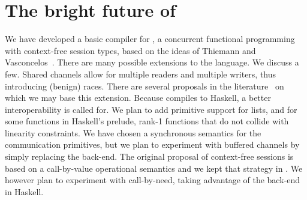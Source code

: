 \section{The bright future of \freest{}}
\label{sec:conclusion}

We have developed a basic compiler for \freest, a concurrent
functional programming with context-free session types, based on the
ideas of Thiemann and Vasconcelos~\cite{DBLP:conf/icfp/ThiemannV16}.
%
There are many possible extensions to the language. We discuss a
few. Shared channels allow for multiple readers and multiple writers,
thus introducing (benign) races. There are several proposals in the
literature~\cite{DBLP:journals/pacmpl/BalzerP17,
  DBLP:conf/sefm/FrancoV13,Lindley.Morris_Lightweight.functional.session.types,DBLP:journals/iandc/Vasconcelos12}
on which we may base this extension.
%
Because \freest{} compiles to Haskell, a better interoperability is
called for. We plan to add primitive support for lists, and for some
functions in Haskell's prelude, rank-1 functions that do not collide
with linearity constraints.
%
We have chosen a synchronous semantics for the communication
primitives, but we plan to experiment with buffered channels by simply
replacing the back-end.
%
The original proposal of context-free sessions is based on a
call-by-value operational semantics and we kept that strategy in
\freest. We however plan to experiment with call-by-need, taking
advantage of the back-end in Haskell.

